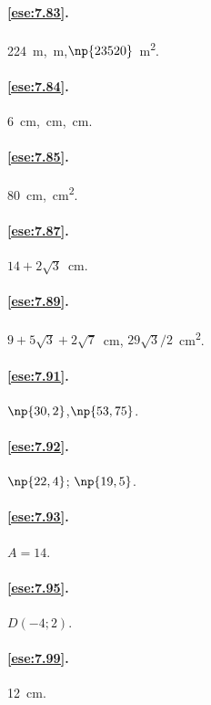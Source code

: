 \paragraph{\ref{ese:7.83}.}
224~m,~m,\quad \(\np{23520}\)~m\textsuperscript{2}.

\paragraph{\ref{ese:7.84}.}
6~cm,~cm,~cm.

\paragraph{\ref{ese:7.85}.}
80~cm,~cm\textsuperscript{2}.

\paragraph{\ref{ese:7.87}.}
\(14 + 2\sqrt{3}\)~cm.

\paragraph{\ref{ese:7.89}.}
\(9 + 5\sqrt{3} + 2\sqrt{7}\)~cm,\quad 
\(29\sqrt{3}/2\)~cm\textsuperscript{2}.

\paragraph{\ref{ese:7.91}.}
\(\np{30,2}\),\quad \(\np{53,75}\).

\paragraph{\ref{ese:7.92}.}
\(\np{22,4}\); \(\np{19,5}\).

\paragraph{\ref{ese:7.93}.}
\(A=14\).

\paragraph{\ref{ese:7.95}.}
\(D(-4;2)\).

\paragraph{\ref{ese:7.99}.}
12~cm.

\endgroup
